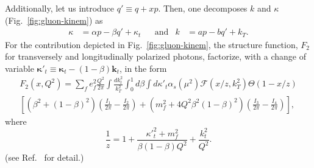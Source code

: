 \documentclass[11pt]{article}
\numberwithin{equation}{section}
\numberwithin{table}{section}
\numberwithin{figure}{section}
\begin{document}
Additionally, let us introduce $q'\equiv q+x p$. 
Then, one  decomposes $k$ and $\kappa$ (Fig.~\ref{fig:gluon-kinem}) as
\begin{align}
    \kappa&=\alpha p-\beta q'+\kappa_t&&\mathrm{and}& k&=a p- bq'+k_T.
\end{align}
For the contribution depicted in Fig.~\ref{fig:gluon-kinem}, the structure function, $F_2$ for transversely and longitudinally polarized photons, factorize, with a change of variable  ${\boldsymbol{\kappa}'}_t\equiv{\boldsymbol{\kappa}_t}-(1-\beta)\mathbf{k}_t$, in the form~\cite{ Kimber:2001uaa,Kwiecinski:1997ee}
\begin{multline}
	F_2(x,Q^2)=\sum_f e_f^2 \frac{Q^2}{2\pi}\int\frac{dk^2_t}{k_T^2}\int^1_0d\beta\int d{\kappa'}_t\alpha_s(\mu^2) \mathcal{F}(x/z,k_T^2)\Theta(1-x/z)\\
	\left[\left(\beta^2+(1-\beta)^2\right)\left(\frac{I_1}{2\pi}-\frac{I_2}{2\pi}\right)
	+\left(m_f^2+4Q^2\beta^2(1-\beta)^2\right)\left(\frac{I_3}{2\pi}-\frac{I_4}{2\pi}\right)\right],
	\label{eq:angle-integrated}
\end{multline}
where
\begin{equation}
	\frac{1}{z}=1+\frac{{\kappa'}^2_t+m_f^2}{\beta(1-\beta)Q^2}+\frac{k^2_t}{Q^2}.
	\label{eq:z}
\end{equation}
(see Ref.~\cite{ Kimber:2001uaa,Kwiecinski:1997ee} for detail.)
\end{document}
